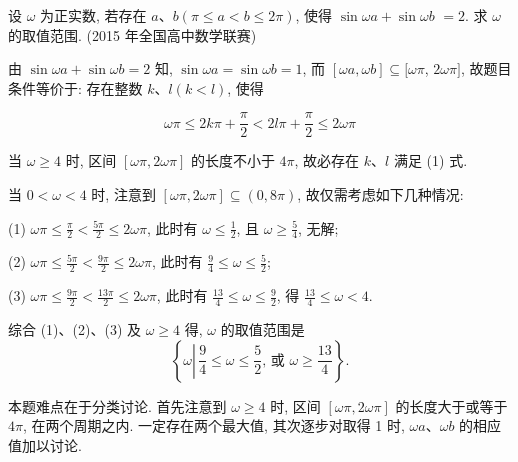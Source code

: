 \begin{example}
	设 $\omega$ 为正实数, 若存在 $a 、 b(\pi \leqslant a<b \leqslant 2 \pi)$, 使得 $\sin \omega a+\sin \omega b$ $=2$. 求 $\omega$ 的取值范围. (2015 年全国高中数学联赛)
\end{example}
\begin{solution}
	由 $\sin \omega a+\sin \omega b=2$ 知, $\sin \omega a=\sin \omega b=1$, 而 $[\omega a, \omega b] \subseteq[\omega \pi$, $2 \omega \pi]$, 故题目条件等价于: 存在整数 $k 、 l(k<l)$, 使得

	\begin{equation*}
		\omega \pi \leqslant 2 k \pi+\frac{\pi}{2}<2 l \pi+\frac{\pi}{2} \leqslant 2 \omega \pi \tag{1}
	\end{equation*}

	当 $\omega \geqslant 4$ 时, 区间 $[\omega \pi, 2 \omega \pi]$ 的长度不小于 $4 \pi$, 故必存在 $k 、 l$ 满足 (1) 式.

	当 $0<\omega<4$ 时, 注意到 $[\omega \pi, 2 \omega \pi] \subseteq(0,8 \pi)$, 故仅需考虑如下几种情况:

	(1) $\omega \pi \leqslant \frac{\pi}{2}<\frac{5 \pi}{2} \leqslant 2 \omega \pi$, 此时有 $\omega \leqslant \frac{1}{2}$, 且 $\omega \geqslant \frac{5}{4}$, 无解;

	(2) $\omega \pi \leqslant \frac{5 \pi}{2}<\frac{9 \pi}{2} \leqslant 2 \omega \pi$, 此时有 $\frac{9}{4} \leqslant \omega \leqslant \frac{5}{2}$;

	(3) $\omega \pi \leqslant \frac{9 \pi}{2}<\frac{13 \pi}{2} \leqslant 2 \omega \pi$, 此时有 $\frac{13}{4} \leqslant \omega \leqslant \frac{9}{2}$, 得 $\frac{13}{4} \leqslant \omega<4$.

	综合 (1)、(2)、(3) 及 $\omega \geqslant 4$ 得, $\omega$ 的取值范围是
	$$
		\left\{\omega \left\lvert\, \frac{9}{4} \leqslant \omega \leqslant \frac{5}{2}\right. \text {, 或 } \omega \geqslant \frac{13}{4}\right\} .
	$$
\end{solution}
\begin{note}
	本题难点在于分类讨论. 首先注意到 $\omega \geqslant 4$ 时, 区间 $[\omega \pi, 2 \omega \pi]$ 的长度大于或等于 $4 \pi$, 在两个周期之内. 一定存在两个最大值, 其次逐步对取得 1 时, $\omega a 、 \omega b$ 的相应值加以讨论.
\end{note}

